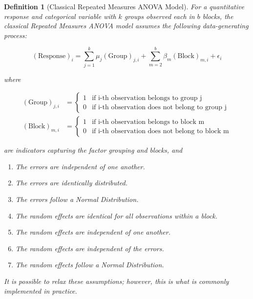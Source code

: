 \documentclass[
]{book}
\providecommand{\tightlist}{%
  \setlength{\itemsep}{0pt}\setlength{\parskip}{0pt}}
\theoremstyle{plain}
\theoremstyle{mydefn}
\newtheorem{definition}{Definition}[chapter]
\theoremstyle{myexmpl}
\theoremstyle{remark}
\begin{document}
\begin{definition}[Classical Repeated Measures ANOVA Model]
\protect\hypertarget{def:defn-classical-repeated-measures}{}{\label{def:defn-classical-repeated-measures} {} }For a quantitative response and categorical variable with \(k\) groups observed each in \(b\) blocks, the classical Repeated Measures ANOVA model assumes the following data-generating process:

\[(\text{Response})_i = \sum_{j=1}^{k} \mu_j (\text{Group})_{j, i} + \sum_{m=2}^{b} \beta_m (\text{Block})_{m, i} + \epsilon_i\]

where

\[
\begin{aligned}
  (\text{Group})_{j,i} &= \begin{cases}
    1 & \text{if i-th observation belongs to group j} \\
    0 & \text{if i-th observation does not belong to group j}
    \end{cases} \\
  (\text{Block})_{m,i} &= \begin{cases}
    1 & \text{if i-th observation belongs to block m} \\
    0 & \text{if i-th observation does not belong to block m}
    \end{cases}
\end{aligned}
\]

are indicators capturing the factor grouping and blocks, and

\begin{enumerate}
\def\labelenumi{\arabic{enumi}.}
\tightlist
\item
  The errors are independent of one another.
\item
  The errors are identically distributed.
\item
  The errors follow a Normal Distribution.
\item
  The random effects are identical for all observations within a block.
\item
  The random effects are independent of one another.
\item
  The random effects are independent of the errors.
\item
  The random effects follow a Normal Distribution.
\end{enumerate}

It is possible to relax these assumptions; however, this is what is commonly implemented in practice.
\end{definition}
\end{document}
